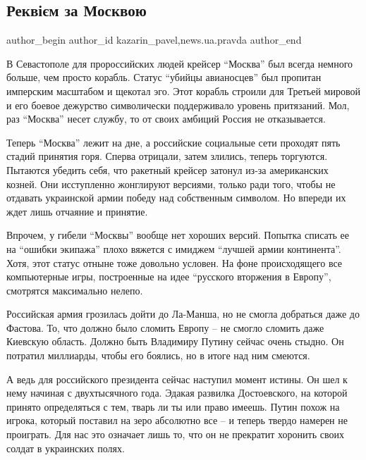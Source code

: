  
 
 
 
 
 
\subsection{Реквієм за Москвою}
\label{sec:17_04_2022.stz.news.ua.pravda.1.rekviem_za_moskvoju}
 
\ifcmt
 author_begin
   author_id kazarin_pavel,news.ua.pravda
 author_end
\fi

В Севастополе для пророссийских людей крейсер \enquote{Москва} был всегда немного
больше, чем просто корабль. Статус \enquote{убийцы авианосцев} был пропитан имперским
масштабом и щекотал эго. Этот корабль строили для Третьей мировой и его боевое
дежурство символически поддерживало уровень притязаний. Мол, раз \enquote{Москва} несет
службу, то от своих амбиций Россия не отказывается.

Теперь \enquote{Москва} лежит на дне, а российские социальные сети проходят пять стадий
принятия горя. Сперва отрицали, затем злились, теперь торгуются. Пытаются
убедить себя, что ракетный крейсер затонул из-за американских козней. Они
исступленно жонглируют версиями, только ради того, чтобы не отдавать украинской
армии победу над собственным символом. Но впереди их ждет лишь отчаяние и
принятие.

Впрочем, у гибели \enquote{Москвы} вообще нет хороших версий. Попытка списать ее на
\enquote{ошибки экипажа} плохо вяжется с имиджем \enquote{лучшей армии континента}. Хотя, этот
статус отныне тоже довольно условен. На фоне происходящего все компьютерные
игры, построенные на идее \enquote{русского вторжения в Европу}, смотрятся максимально
нелепо.

Российская армия грозилась дойти до Ла-Манша, но не смогла добраться даже до
Фастова. То, что должно было сломить Европу – не смогло сломить даже Киевскую
область. Должно быть Владимиру Путину сейчас очень стыдно. Он потратил
миллиарды, чтобы его боялись, но в итоге над ним смеются.

А ведь для российского президента сейчас наступил момент истины. Он шел к нему
начиная с двухтысячного года. Эдакая развилка Достоевского, на которой принято
определяться с тем, тварь ли ты или право имеешь. Путин похож на игрока,
который поставил на зеро абсолютно все – и теперь твердо намерен не проиграть.
Для нас это означает лишь то, что он не прекратит хоронить своих солдат в
украинских полях.

